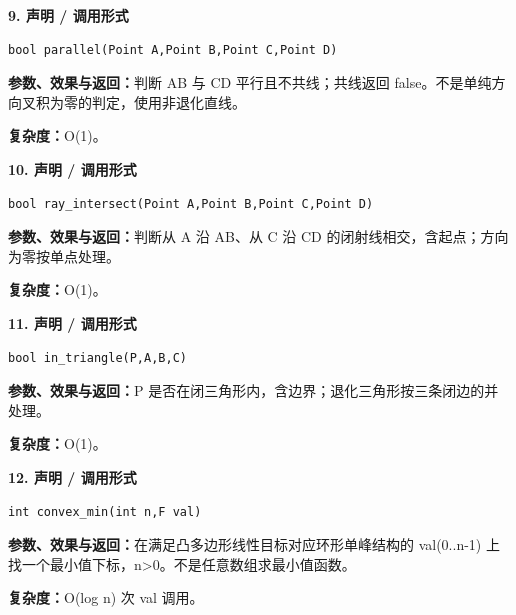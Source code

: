 \documentclass[UTF8,a4paper,10pt]{ctexart}
\begin{document}
\noindent\begin{minipage}{\textwidth}
\textbf{9. 声明 / 调用形式}
\begin{lstlisting}
bool parallel(Point A,Point B,Point C,Point D)
\end{lstlisting}
\textbf{参数、效果与返回：}判断 AB 与 CD 平行且不共线；共线返回 false。不是单纯方向叉积为零的判定，使用非退化直线。

\textbf{复杂度：}O(1)。

\end{minipage}\par\vspace{0.4em}
\noindent\begin{minipage}{\textwidth}
\textbf{10. 声明 / 调用形式}
\begin{lstlisting}
bool ray_intersect(Point A,Point B,Point C,Point D)
\end{lstlisting}
\textbf{参数、效果与返回：}判断从 A 沿 AB、从 C 沿 CD 的闭射线相交，含起点；方向为零按单点处理。

\textbf{复杂度：}O(1)。

\end{minipage}\par\vspace{0.4em}
\noindent\begin{minipage}{\textwidth}
\textbf{11. 声明 / 调用形式}
\begin{lstlisting}
bool in_triangle(P,A,B,C)
\end{lstlisting}
\textbf{参数、效果与返回：}P 是否在闭三角形内，含边界；退化三角形按三条闭边的并处理。

\textbf{复杂度：}O(1)。

\end{minipage}\par\vspace{0.4em}
\noindent\begin{minipage}{\textwidth}
\textbf{12. 声明 / 调用形式}
\begin{lstlisting}
int convex_min(int n,F val)
\end{lstlisting}
\textbf{参数、效果与返回：}在满足凸多边形线性目标对应环形单峰结构的 val(0..n-1) 上找一个最小值下标，n>0。不是任意数组求最小值函数。

\textbf{复杂度：}O(log n) 次 val 调用。

\end{minipage}\par\vspace{0.4em}
\end{document}
